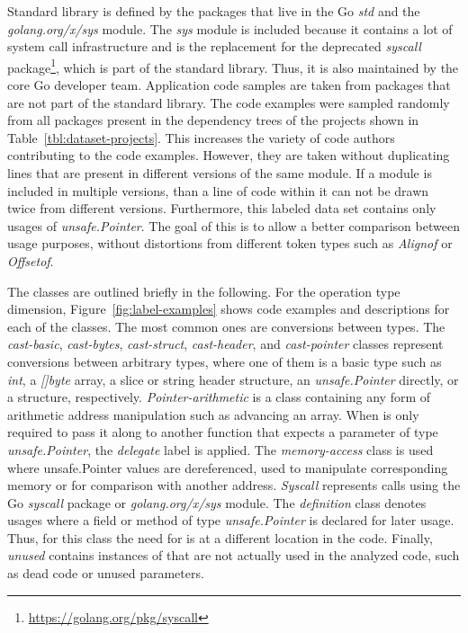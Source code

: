 Standard library is defined by the packages that live in the Go \textit{std} and the \textit{golang.org/x/sys} module.
The \textit{sys} module is included because it contains a lot of system call infrastructure and is the replacement for
the deprecated \textit{syscall} package\footnote{\url{https://golang.org/pkg/syscall}}, which is part of the standard
library.
Thus, it is also maintained by the core Go developer team.
Application code samples are taken from packages that are not part of the standard library.
The \numberLabeledCodeSnippets{} code examples were sampled randomly from all packages present in the dependency trees
of the projects shown in Table~\ref{tbl:dataset-projects}.
This increases the variety of code authors contributing to the code examples.
However, they are taken without duplicating lines that are present in different versions of the same module.
If a module is included in multiple versions, than a line of code within it can not be drawn twice from different
versions.
Furthermore, this labeled data set contains only usages of \textit{unsafe.Pointer}.
The goal of this is to allow a better comparison between usage purposes, without distortions from different \unsafe{}
token types such as \textit{Alignof} or \textit{Offsetof}.



The classes are outlined briefly in the following.
For the \unsafe{} operation type dimension, Figure~\ref{fig:label-examples} shows code examples and descriptions for
each of the classes.
The most common ones are conversions between types.
The \textit{cast-basic}, \textit{cast-bytes}, \textit{cast-struct}, \textit{cast-header}, and \textit{cast-pointer}
classes represent conversions between arbitrary types, where one of them is a basic type such as \textit{int}, a
\textit{[]byte} array, a slice or string header structure, an \textit{unsafe.Pointer} directly, or a structure,
respectively.
\textit{Pointer-arithmetic} is a class containing any form of arithmetic address manipulation such as advancing an
array.
When \unsafe{} is only required to pass it along to another function that expects a parameter of type
\textit{unsafe.Pointer}, the \textit{delegate} label is applied.
The \textit{memory-access} class is used where unsafe.Pointer values are dereferenced, used to manipulate corresponding
memory or for comparison with another address.
\textit{Syscall} represents calls using the Go \textit{syscall} package or \textit{golang.org/x/sys} module.
The \textit{definition} class denotes usages where a field or method of type \textit{unsafe.Pointer} is declared for
later usage.
Thus, for this class the need for \unsafe{} is at a different location in the code.
Finally, \textit{unused} contains instances of \unsafe{} that are not actually used in the analyzed code, such as dead
code or unused parameters.

